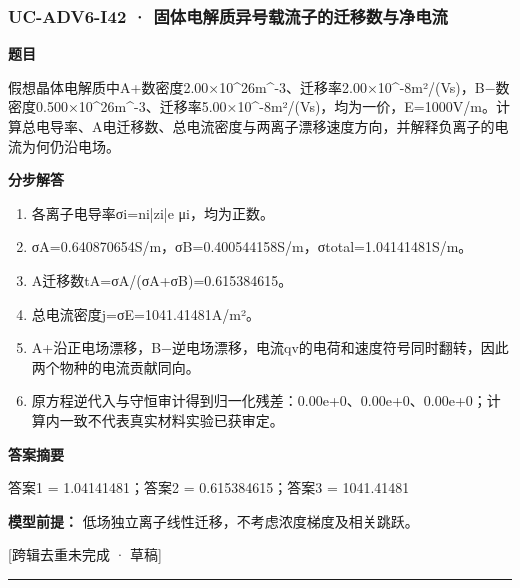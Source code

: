 \documentclass[UTF8,11pt,a4paper]{ctexart}
\begin{document}
\subsubsection*{UC-ADV6-I42 · 固体电解质异号载流子的迁移数与净电流}
\noindent\textbf{题目}\par
假想晶体电解质中A+数密度2.00×10\textasciicircum{}26m\textasciicircum{}-3、迁移率2.00×10\textasciicircum{}-8m²/(Vs)，B−数密度0.500×10\textasciicircum{}26m\textasciicircum{}-3、迁移率5.00×10\textasciicircum{}-8m²/(Vs)，均为一价，E=1000V/m。计算总电导率、A电迁移数、总电流密度与两离子漂移速度方向，并解释负离子的电流为何仍沿电场。\par
\medskip\noindent\textbf{分步解答}
\begin{enumerate}
\item 各离子电导率σi=ni|zi|e μi，均为正数。
\item σA=0.640870654S/m，σB=0.400544158S/m，σtotal=1.04141481S/m。
\item A迁移数tA=σA/(σA+σB)=0.615384615。
\item 总电流密度j=σE=1041.41481A/m²。
\item A+沿正电场漂移，B−逆电场漂移，电流qv的电荷和速度符号同时翻转，因此两个物种的电流贡献同向。
\item 原方程逆代入与守恒审计得到归一化残差：0.00e+0、0.00e+0、0.00e+0；计算内一致不代表真实材料实验已获审定。
\end{enumerate}
\noindent\textbf{答案摘要}\par
答案1 = 1.04141481；答案2 = 0.615384615；答案3 = 1041.41481\par
\noindent\textbf{模型前提：}
低场独立离子线性迁移，不考虑浓度梯度及相关跳跃。\par
\noindent\textcolor{red!65!black}{[跨辑去重未完成 · 草稿]} \par
\medskip\hrule\medskip
{}
\end{document}
